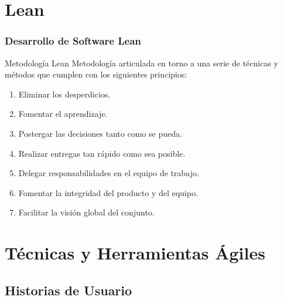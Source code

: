 \documentclass[animated,a4paper,slidestop,xcolor=pst,blue]{beamer}
\begin{document}
\section{Lean}

\begin{frame}[c]
	\frametitle{Desarrollo de Software \alert{Lean}}
    \begin{block}{Metodología Lean}
        Metodología articulada en torno a una serie de técnicas y métodos que cumplen con los siguientes principios:
    	\begin{enumerate}[<+->]
		    \item Eliminar los desperdicios.
            \item Fomentar el aprendizaje.
            \item Postergar las decisiones tanto como se pueda.
            \item Realizar entregas tan rápido como sea posible.
            \item Delegar responsabilidades en el equipo de trabajo.
            \item Fomentar la integridad del producto y del equipo.
            \item Facilitar la visión global del conjunto.
	   \end{enumerate}
    \end{block}
\end{frame}

\section{Técnicas y Herramientas Ágiles}

\subsection{Historias de Usuario}
\end{document}
